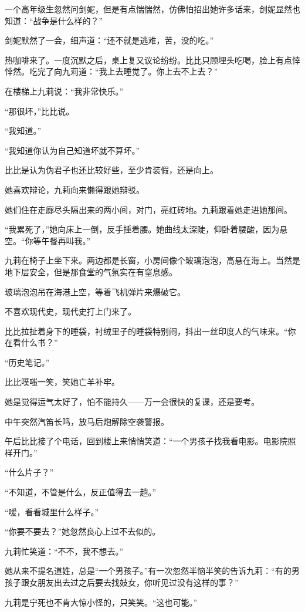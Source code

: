 \par 一个高年级生忽然问剑妮，但是有点惴惴然，仿佛怕招出她许多话来，剑妮显然也知道：“战争是什么样的？”
\par 剑妮默然了一会，细声道：“还不就是逃难，苦，没的吃。”
\par 热咖啡来了。一度沉默之后，桌上复又议论纷纷。比比只顾埋头吃喝，脸上有点悻悻然。吃完了向九莉道：“我上去睡觉了。你上去不上去？”
\par 在楼梯上九莉说：“我非常快乐。”
\par “那很坏，”比比说。
\par “我知道。”
\par “我知道你认为自己知道坏就不算坏。”
\par 比比是认为伪君子也还比较好些，至少肯装假，还是向上。
\par 她喜欢辩论，九莉向来懒得跟她辩驳。
\par 她们住在走廊尽头隔出来的两小间，对门，亮红砖地。九莉跟着她走进她那间。
\par “我累死了，”她向床上一倒，反手捶着腰。她曲线太深陡，仰卧着腰酸，因为悬空。“你等午餐再叫我。”
\par 九莉在椅子上坐下来。两边都是长窗，小房间像个玻璃泡泡，高悬在海上。当然是地下层安全，但是那食堂的气氛实在有窒息感。
\par 玻璃泡泡吊在海港上空，等着飞机弹片来爆破它。
\par 不喜欢现代史，现代史打上门来了。
\par 比比拉扯着身下的睡袋，衬绒里子的睡袋特别闷，抖出一丝印度人的气味来。“你在看什么书？”
\par “历史笔记。”
\par 比比噗嗤一笑，笑她亡羊补牢。
\par 她是觉得运气太好了，怕不能持久——万一会很快的复课，还是要考。
\par 中午突然汽笛长鸣，放马后炮解除空袭警报。
\par 午后比比接了个电话，回到楼上来悄悄笑道：“一个男孩子找我看电影。电影院照样开门。”
\par “什么片子？”
\par “不知道，不管是什么，反正值得去一趟。”
\par “嗳，看看城里什么样子。”
\par “你要不要去？”她忽然良心上过不去似的。
\par 九莉忙笑道：“不不，我不想去。”
\par 她从来不提名道姓，总是“一个男孩子。”有一次忽然半恼半笑的告诉九莉：“有的男孩子跟女朋友出去过之后要去找妓女，你听见过没有这样的事？”
\par 九莉是宁死也不肯大惊小怪的，只笑笑。“这也可能。”

